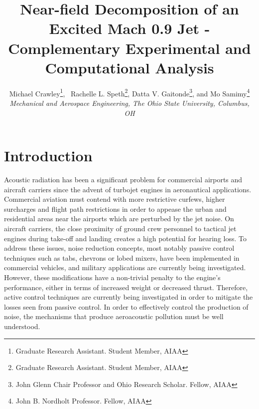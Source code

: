 \documentclass[english]{aiaa-tc}
\begin{document}
\title{Near-field Decomposition of an Excited Mach 0.9 Jet - Complementary Experimental and Computational Analysis}


\author{Michael Crawley\thanks{Graduate Research Assistant. Student Member, AIAA}, \
Rachelle L. Speth\thanks{Graduate Research Assistant. Student Member, AIAA},
 Datta V. Gaitonde\thanks{John Glenn Chair Professor and Ohio Research Scholar. Fellow, AIAA},
 and Mo Samimy\thanks{John B. Nordholt Professor. Fellow, AIAA}
\\\normalsize\itshape Mechanical and Aerospace Engineering, The Ohio State University, Columbus, OH \\}


\maketitle

\section{Introduction}

 Acoustic radiation has been a significant problem for commercial airports and aircraft carriers since the advent of turbojet engines in aeronautical applications. Commercial aviation must contend with more restrictive curfews, higher surcharges and flight path restrictions in order to appease the urban and residential areas near the airports which are perturbed by the jet noise. On aircraft carriers, the close proximity of ground crew personnel to tactical jet engines during take-off and landing creates a high potential for hearing loss. To address these issues, noise reduction concepts, most notably passive control techniques such as tabs, chevrons or lobed mixers, have been implemented in commercial vehicles, and military applications are currently being investigated. However, these modifications have a non-trivial penalty to the engine's performance, either in terms of increased weight or decreased thrust. Therefore, active control techniques are currently being investigated in order to mitigate the losses seen from passive control. In order to effectively control the production of noise, the mechanisms that produce aeroacoustic pollution  must be well understood. 
\end{document}

